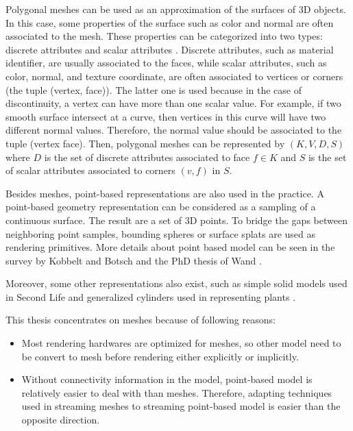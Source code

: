 \documentclass[11pt, a4paper]{report}
\begin{document}
    Polygonal meshes can be used as an approximation of the surfaces
    of 3D objects. In this case, some properties of the surface such
    as color and normal are often associated to the mesh. These
    properties can be categorized into two types: discrete attributes
    and scalar attributes \label{property}. Discrete attributes, such
    as material identifier, are usually associated to the faces, while
    scalar attributes, such as color, normal, and texture coordinate,
    are often associated to vertices or corners (the tuple (vertex,
    face)). The latter one is used because in the case of
    discontinuity, a vertex can have more than one scalar value. For
    example, if two smooth surface intersect at a curve, then vertices
    in this curve will have two different normal values. Therefore,
    the normal value should be associated to the tuple (vertex face).
    Then, polygonal meshes can be represented by $(K, V, D, S)$ where
    $D$ is the set of discrete attributes associated to face $f \in
    K$ and $S$ is the set of scalar attributes associated to corners $(v, f)$ in $S$.
    
    Besides meshes, point-based representations are also used in the practice.
    A point-based geometry representation can be considered as a 
    sampling of a continuous surface.  The result are a set of 3D points. 
    To bridge the gaps between neighboring point samples, 
    bounding spheres \cite{rusinkiewicz:qsplat, 364350} or surface splats \cite{383300} are used as rendering primitives. 
    More details about point based model can be seen in the survey by Kobbelt and Botsch \cite{DBLP:journals/cg/KobbeltB04} 
    and the PhD thesis of Wand \cite{wand:point}.  
    
    Moreover, some other representations also exist, such as simple solid models used in Second Life
    and generalized cylinders used in representing plants \cite{plant:seb, compact:mondet}.

    This thesis concentrates on meshes because of following reasons:
    \begin{itemize}
        \item Most rendering hardwares are optimized for meshes, so other model need to be convert
            to mesh before rendering either explicitly or implicitly. 
        \item Without connectivity information in the model, point-based model is relatively easier to deal with
            than meshes. Therefore, adapting techniques used in streaming meshes to streaming point-based model
            is easier than the opposite direction.
    \end{itemize}
\end{document}
